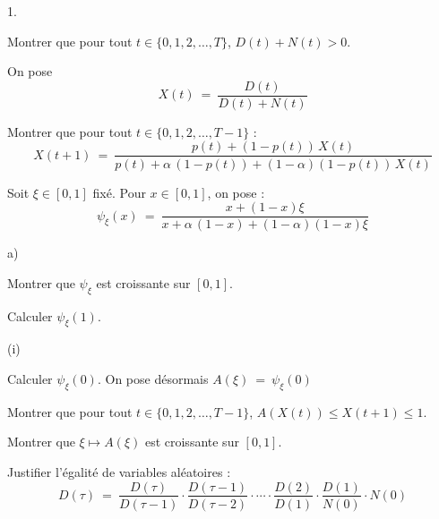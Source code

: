 \begin{noliste}{1.}
  \setlength{\itemsep}{4mm}
  \setcounter{enumi}{4}
  \item Montrer que pour tout $t \in \{0,1,2, \ldots, T\}$, $D(t) 
  +N(t) >0$.
  
  
  
  

  
  On pose
  \[
    X(t) \ = \ \dfrac{D(t)}{D(t) + N(t)}
  \]  
  
  \item Montrer que pour tout $t\in \{0,1,2, \ldots, T-1\}$ :
  \[
    X(t+1) \ = \ \dfrac{p(t) + (1-p(t)) \, X(t)}{p(t) + \alpha \, 
    (1-p(t)) + (1-\alpha)(1-p(t)) \, X(t)}
  \]
  
  

  
  \item Soit $\xi \in [0,1]$ fixé. Pour $x \in [0,1]$, on pose :
  \[
    \psi_\xi(x) \ = \ \dfrac{x+ (1-x) \xi}{x + \alpha \, (1-x) + 
    (1- \alpha)(1-x)\xi}
  \]
  \begin{noliste}{a)}
    \setlength{\itemsep}{2mm}
    \item Montrer que $\psi_\xi$ est croissante sur $[0,1]$.
    
    

    
    \item Calculer $\psi_\xi(1)$.
    
    

    
    \item 
    \begin{nonoliste}{(i)}
      \item Calculer $\psi_\xi(0)$. On pose désormais
      $
        A(\xi) \ = \ \psi_\xi(0)
      $
      
      
      
      

      
      \item Montrer que pour tout $t\in \{0,1,2, \ldots, T-1\}$, 
      $A(X(t)) \leq X(t+1) \leq 1$.
      
      

      
      \item Montrer que $\xi \mapsto A(\xi)$ est croissante sur $[0,1]$.
      
      
    \end{nonoliste}
  \end{noliste}
    
  \item Justifier l'égalité de variables aléatoires :
  \[
    D(\tau) \ = \ \dfrac{D(\tau)}{D(\tau-1)} \cdot \dfrac{D(\tau-1)}
    {D(\tau-2)} \cdot \cdots \cdot \dfrac{D(2)}{D(1)} \cdot 
    \dfrac{D(1)}{N(0)} \cdot N(0)
  \]
  

\end{noliste}
